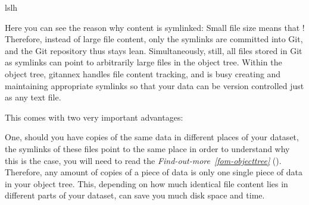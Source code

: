 \begin{sphinxVerbatim}[commandchars=\\\{\}]
ls\PYGZhy{}lh
\end{sphinxVerbatim}

\sphinxAtStartPar
Here you can see the reason why content is symlinked: Small file size means that
!
Therefore, instead of large file content, only the symlinks are committed into
Git, and the Git repository thus stays lean. Simultaneously, still, all
files stored in Git as symlinks can point to arbitrarily large files in the
object tree. Within the object tree, git\sphinxhyphen{}annex handles file content tracking,
and is busy creating and maintaining appropriate symlinks so that your data
can be version controlled just as any text file.

\sphinxAtStartPar
This comes with two very important advantages:

\sphinxAtStartPar
One, should you have copies of the
same data in different places of your dataset, the symlinks of these files
point to the same place \sphinxhyphen{} in order to understand why this is the case, you
will need to read the \textit{Find-out-more}~{\findoutmoreiconinline}\textit{\ref{fom-objecttree}} {\hyperref[\detokenize{basics/101-115-symlinks:fom-objecttree}]{}} ().
Therefore, any amount of copies of a piece of data
is only one single piece of data in your object tree. This, depending on
how much identical file content lies in different parts of your dataset,
can save you much disk space and time.

